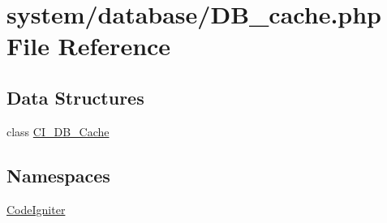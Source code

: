 \hypertarget{_d_b__cache_8php}{}\section{system/database/\+D\+B\+\_\+cache.php File Reference}
\label{_d_b__cache_8php}
\subsection*{Data Structures}
\begin{DoxyCompactItemize}
\item 
class \mbox{\hyperlink{class_c_i___d_b___cache}{C\+I\+\_\+\+D\+B\+\_\+\+Cache}}
\end{DoxyCompactItemize}
\subsection*{Namespaces}
\begin{DoxyCompactItemize}
\item 
 \mbox{\hyperlink{namespace_code_igniter}{Code\+Igniter}}
\end{DoxyCompactItemize}
